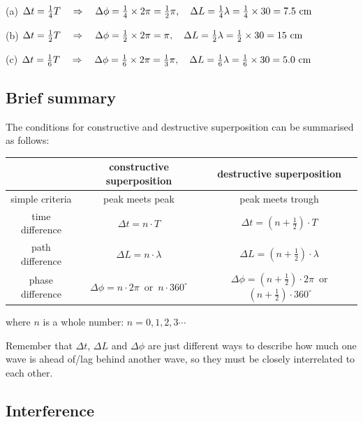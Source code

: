 \begin{soln}
(a) $\Delta t = \frac{1}{4}T \quad \Rightarrow \quad \Delta \phi = \frac{1}{4}\times 2\pi = \frac{1}{2}\pi, \quad \Delta L = \frac{1}{4} \lambda = \frac{1}{4}\times30 = 7.5 \text{ cm}$

\eqyskip (b) $\Delta t = \frac{1}{2}T \quad \Rightarrow \quad \Delta \phi = \frac{1}{2}\times 2\pi = \pi, \quad \Delta L = \frac{1}{2} \lambda = \frac{1}{2}\times30 = 15 \text{ cm}$

\eqyskip (c) $\Delta t = \frac{1}{6}T \quad \Rightarrow \quad \Delta \phi = \frac{1}{6}\times 2\pi = \frac{1}{3}\pi, \quad \Delta L = \frac{1}{6} \lambda = \frac{1}{6}\times30 = 5.0 \text{ cm}$ \end{soln}


\subsection*{Brief summary}

The conditions for constructive and destructive superposition can be summarised as follows:

\begin{center}
{\renewcommand{\arraystretch}{1.25}
\begin{tabular}{|c|c|c|}
	\hline
	& constructive superposition & destructive superposition \\
	\hline
	simple criteria & peak meets peak & peak meets trough \\
	\hline
	time difference & $\Delta t = n \cdot T$ & $\Delta t = \left(n+\frac{1}{2}\right) \cdot T$ \\
	\hline
	path difference & $\Delta L = n \cdot \lambda$ & $\Delta L = \left(n+\frac{1}{2}\right) \cdot \lambda$ \\
	\hline
	phase difference & $\Delta \phi = n\cdot 2\pi\,$ or $\,n\cdot 360^\circ$ & $\Delta \phi = \left(n+\frac{1}{2}\right)\cdot 2\pi \,$ or $\,\left(n+\frac{1}{2}\right)\cdot 360^\circ$ \\
	\hline
\end{tabular}
}
\end{center}

where $n$ is a whole number: $n=0, 1, 2, 3 \cdots$

Remember that $\Delta t$, $\Delta L$ and $\Delta \phi$ are just different ways to describe how much one wave is ahead of/lag behind another wave, so they must be closely interrelated to each other.




\newpage

\subsection{Interference}

